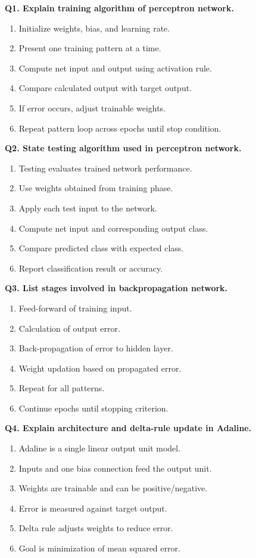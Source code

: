 \documentclass[11pt,a4paper]{article}
\begin{document}
\textbf{Q1. Explain training algorithm of perceptron network.}
\begin{enumerate}
\item Initialize weights, bias, and learning rate.
\item Present one training pattern at a time.
\item Compute net input and output using activation rule.
\item Compare calculated output with target output.
\item If error occurs, adjust trainable weights.
\item Repeat pattern loop across epochs until stop condition.
\end{enumerate}

\textbf{Q2. State testing algorithm used in perceptron network.}
\begin{enumerate}
\item Testing evaluates trained network performance.
\item Use weights obtained from training phase.
\item Apply each test input to the network.
\item Compute net input and corresponding output class.
\item Compare predicted class with expected class.
\item Report classification result or accuracy.
\end{enumerate}

\textbf{Q3. List stages involved in backpropagation network.}
\begin{enumerate}
\item Feed-forward of training input.
\item Calculation of output error.
\item Back-propagation of error to hidden layer.
\item Weight updation based on propagated error.
\item Repeat for all patterns.
\item Continue epochs until stopping criterion.
\end{enumerate}

\textbf{Q4. Explain architecture and delta-rule update in Adaline.}
\begin{enumerate}
\item Adaline is a single linear output unit model.
\item Inputs and one bias connection feed the output unit.
\item Weights are trainable and can be positive/negative.
\item Error is measured against target output.
\item Delta rule adjusts weights to reduce error.
\item Goal is minimization of mean squared error.
\end{enumerate}
\end{document}
